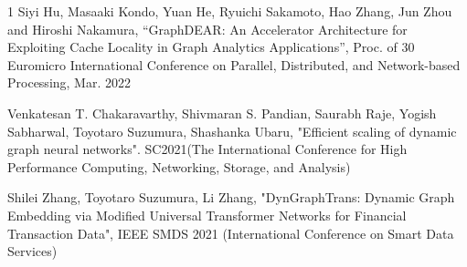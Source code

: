 \begin{査読付}{1}
Siyi Hu, Masaaki Kondo, Yuan He, Ryuichi Sakamoto, Hao Zhang, Jun Zhou
and Hiroshi Nakamura, ``GraphDEAR: An Accelerator Architecture for
Exploiting Cache Locality in Graph Analytics Applications'', Proc. of 30
Euromicro International Conference on Parallel, Distributed, and
Network-based Processing, Mar. 2022


Venkatesan T. Chakaravarthy, Shivmaran S. Pandian, Saurabh Raje, Yogish Sabharwal, Toyotaro Suzumura, Shashanka Ubaru, 
"Efficient scaling of dynamic graph neural networks". SC2021(The International Conference for High Performance Computing, Networking, Storage, and Analysis)

Shilei Zhang, Toyotaro Suzumura, Li Zhang, "DynGraphTrans: Dynamic Graph Embedding via Modified Universal Transformer Networks for Financial Transaction Data", IEEE SMDS 2021 (International Conference on Smart Data Services) 
\end{査読付}







